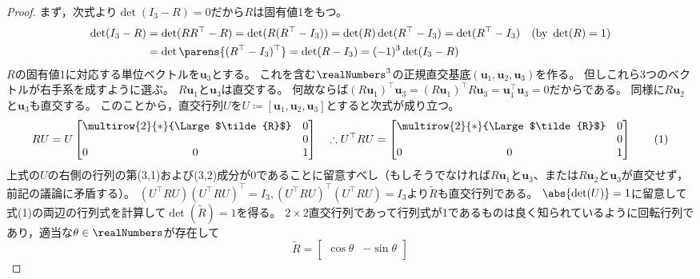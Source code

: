        \begin{proof}
            まず，次式より$\det(I_3-R) = 0$だから$R$は固有値1をもつ。
            \begin{align*}
                \det(I_3-R) &= \det(RR^\top-R) = \det(R(R^\top-I_3)) = \det(R)\det(R^\top-I_3) = \det(R^\top-I_3)\quad(\text{by }\det(R)=1)\\
                &= \det\parens{(R^\top-I_3)^\top} = \det(R-I_3) = (-1)^3 \det(I_3-R)
            \end{align*}
            $R$の固有値1に対応する単位ベクトルを$\bm{u}_3$とする。
            これを含む$\realNumbers^3$の正規直交基底$(\bm{u}_1,\bm{u}_2,\bm{u}_3)$を作る。
            但しこれら3つのベクトルが右手系を成すように選ぶ。
            $R\bm{u}_1$と$\bm{u}_3$は直交する。
            何故ならば$(R\bm{u}_1)^\top\bm{u}_3 = (R\bm{u}_1)^\top R\bm{u}_3 = \bm{u}_1^\top \bm{u}_3 = 0$だからである。
            同様に$R\bm{u}_2$と$\bm{u}_3$も直交する。
            このことから，直交行列$U$を$U\coloneq[\bm{u}_1,\bm{u}_2,\bm{u}_3]$とすると次式が成り立つ。
            \[
                RU = U\begin{bmatrix}
                    \multicolumn{2}{c}{\multirow{2}{*}{\Large $\tilde{R}$}} & 0 \\
                    \multicolumn{2}{c}{} & 0 \\
                    0 & 0 & 1
                \end{bmatrix}
                \quad\therefore
                U^\top RU = \begin{bmatrix}
                    \multicolumn{2}{c}{\multirow{2}{*}{\Large $\tilde{R}$}} & 0 \\
                    \multicolumn{2}{c}{} & 0 \\
                    0 & 0 & 1
                \end{bmatrix}
                \tag{1}
            \]
            上式の$U$の右側の行列の第(3,1)および(3,2)成分が0であることに留意すべし（もしそうでなければ$R\bm{u}_1$と$\bm{u}_3$、または$R\bm{u}_2$と$\bm{u}_3$が直交せず，前記の議論に矛盾する）。
            $(U^\top RU)(U^\top RU)^\top = I_3,(U^\top RU)^\top (U^\top RU) = I_3$より$\tilde{R}$も直交行列である。
            $\abs{\det(U)}=1$に留意して式(1)の両辺の行列式を計算して$\det(\tilde{R})=1$を得る。
            $2\times 2$直交行列であって行列式が1であるものは良く知られているように回転行列であり，適当な$\theta\in\realNumbers$が存在して
            \[
                \tilde{R} = \begin{bmatrix}
                    \cos\theta & -\sin\theta \\

\end{bmatrix}\]
\end{proof}
